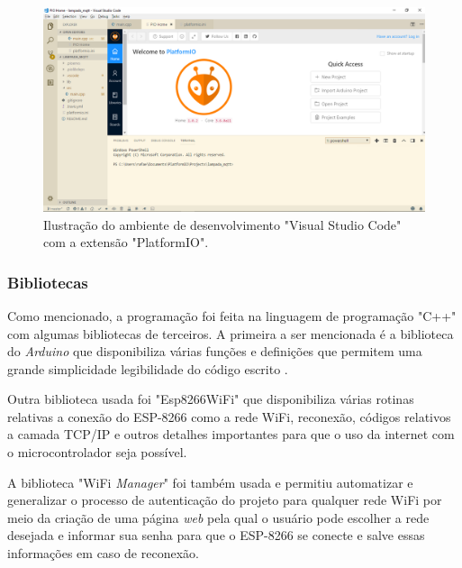 \begin{figure}[ht]
    \begin{center}
    \includegraphics[width=\textwidth]{figuras/pio.PNG}
    \end{center}
    \caption[Ilustração do Visual Studio Code com o PlatformIO.]{Ilustração do ambiente de desenvolvimento "Visual Studio Code" com a extensão "PlatformIO".}
    \label{pio}
\end{figure}

\subsubsection{Bibliotecas}

Como mencionado, a programação foi feita na linguagem de programação "C++" com algumas bibliotecas de terceiros. A primeira a ser mencionada é a biblioteca do \textit{Arduino} que disponibiliza várias funções e definições que permitem uma grande simplicidade legibilidade do código escrito \cite{arduino}.

Outra biblioteca usada foi "Esp8266WiFi" \cite{espwifi}que disponibiliza várias rotinas relativas a conexão do ESP-8266 como a rede WiFi, reconexão, códigos relativos a camada TCP/IP e outros detalhes importantes para que o uso da internet com o microcontrolador seja possível.

A biblioteca "WiFi \textit{Manager}" \cite{wifimng} foi também usada e permitiu automatizar e generalizar o processo de autenticação do projeto para qualquer rede WiFi por meio da criação de uma página \textit{web} pela qual o usuário pode escolher a rede desejada e informar sua senha para que o ESP-8266 se conecte e salve essas informações em caso de reconexão.
